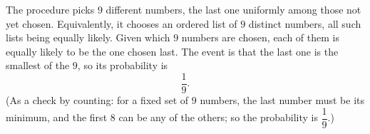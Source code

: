 The procedure picks $9$ different numbers, the last one uniformly among those not yet chosen. Equivalently, it chooses an ordered list of $9$ distinct numbers, all such lists being equally likely. Given which $9$ numbers are chosen, each of them is equally likely to be the one chosen last. The event is that the last one is the smallest of the $9$, so its probability is
\[
\boxed{\dfrac{1}{9}}.
\]
(As a check by counting: for a fixed set of $9$ numbers, the last number must be its minimum, and the first $8$ can be any of the others; so the probability is $\dfrac{1}{9}$.)
